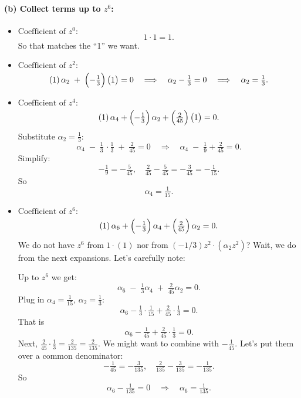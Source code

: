 \documentclass[12pt]{article}
\theoremstyle{definition} %
\theoremstyle{plain} %
\begin{document}
\medskip

\paragraph{(b) Collect terms up to $z^6$:}

\begin{itemize}
  \item \(\text{Coefficient of }z^0:\)
    \[
    1 \cdot 1 = 1.
    \]
    So that matches the “1” we want.

  \item \(\text{Coefficient of }z^2:\)
    \[
    (1)\,\alpha_2 \;+\;\Bigl(-\tfrac{1}{3}\Bigr)\,\bigl(1\bigr)
    = 0 
    \quad\Longrightarrow\quad
    \alpha_2 - \tfrac{1}{3} = 0
    \quad\Longrightarrow\quad
    \alpha_2 = \tfrac{1}{3}.
    \]

  \item \(\text{Coefficient of }z^4:\)
    \[
    (1)\,\alpha_4 + \Bigl(-\tfrac{1}{3}\Bigr)\,\alpha_2 + \Bigl(\tfrac{2}{45}\Bigr)\,\bigl(1\bigr)
    = 0.
    \]
    Substitute $\alpha_2=\tfrac{1}{3}$:
    \[
    \alpha_4 \;-\;\tfrac{1}{3}\,\cdot \tfrac{1}{3} \;+\;\tfrac{2}{45} = 0
    \quad\Longrightarrow\quad
    \alpha_4 \;-\;\tfrac{1}{9} + \tfrac{2}{45} = 0.
    \]
    Simplify:
    \[
    -\tfrac{1}{9} = -\tfrac{5}{45}, 
    \quad \tfrac{2}{45} - \tfrac{5}{45} = -\tfrac{3}{45} = -\tfrac{1}{15}.
    \]
    So
    \[
    \alpha_4 = \tfrac{1}{15}.
    \]

  \item \(\text{Coefficient of }z^6:\)
    \[
    (1)\,\alpha_6 + \Bigl(-\tfrac{1}{3}\Bigr)\,\alpha_4 + \Bigl(\tfrac{2}{45}\Bigr)\,\alpha_2 = 0.
    \]
    We do not have $z^6$ from $1\cdot(1)$ nor from $(-1/3)z^2\cdot(\alpha_2 z^2)$? Wait, we do from the next expansions. Let's carefully note:

    Up to $z^6$ we get:
    \[
    \alpha_6 \;-\;\tfrac{1}{3}\alpha_4 \;+\;\tfrac{2}{45}\alpha_2 = 0.
    \]
    Plug in $\alpha_4=\tfrac{1}{15}$, $\alpha_2=\tfrac{1}{3}$:
    \[
    \alpha_6 - \tfrac{1}{3}\cdot \tfrac{1}{15} + \tfrac{2}{45}\cdot \tfrac{1}{3} = 0.
    \]
    That is
    \[
    \alpha_6 - \tfrac{1}{45} + \tfrac{2}{45}\cdot \tfrac{1}{3} = 0.
    \]
    Next, $\tfrac{2}{45}\cdot \tfrac{1}{3} = \tfrac{2}{135} = \tfrac{2}{135}$. We might want to combine with $-\tfrac{1}{45}$. Let's put them over a common denominator:
    \[
    -\tfrac{1}{45} = -\tfrac{3}{135}, 
    \quad
    \tfrac{2}{135} - \tfrac{3}{135} = -\tfrac{1}{135}.
    \]
    So
    \[
    \alpha_6 - \tfrac{1}{135} = 0
    \quad\Longrightarrow\quad
    \alpha_6 = \tfrac{1}{135}.
    \]
\end{itemize}
\end{document}
